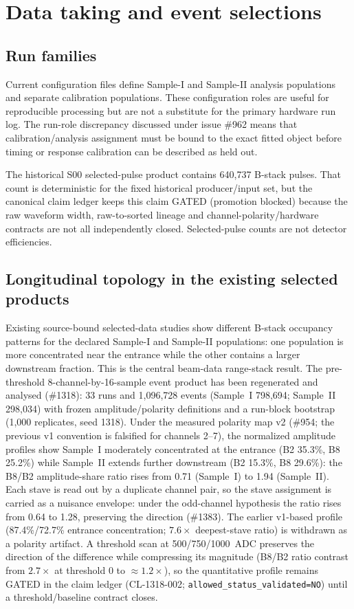 \section{Data taking and event selections}

\subsection{Run families}

Current configuration files define Sample-I and Sample-II analysis populations and separate calibration populations. These configuration roles are useful for reproducible processing but are not a substitute for the primary hardware run log. The run-role discrepancy discussed under issue \#962 means that calibration/analysis assignment must be bound to the exact fitted object before timing or response calibration can be described as held out.

The historical S00 selected-pulse product contains 640,737 B-stack pulses. That count is deterministic for the fixed historical producer/input set, but the canonical claim ledger keeps this claim GATED (promotion blocked) because the raw waveform width, raw-to-sorted lineage and channel-polarity/hardware contracts are not all independently closed. Selected-pulse counts are not detector efficiencies.

\subsection{Longitudinal topology in the existing selected products}

Existing source-bound selected-data studies show different B-stack occupancy patterns for the declared Sample-I and Sample-II populations: one population is more concentrated near the entrance while the other contains a larger downstream fraction. This is the central beam-data range-stack result. The pre-threshold 8-channel-by-16-sample event product has been regenerated and analysed (\#1318): 33 runs and 1{,}096{,}728 events (Sample~I 798{,}694; Sample~II 298{,}034) with frozen amplitude/polarity definitions and a run-block bootstrap (1{,}000 replicates, seed 1318). Under the measured polarity map v2 (\#954; the previous v1 convention is falsified for channels 2--7), the normalized amplitude profiles show Sample~I moderately concentrated at the entrance (B2 35.3\%, B8 25.2\%) while Sample~II extends further downstream (B2 15.3\%, B8 29.6\%): the B8/B2 amplitude-share ratio rises from 0.71 (Sample~I) to 1.94 (Sample~II). Each stave is read out by a duplicate channel pair, so the stave assignment is carried as a nuisance envelope: under the odd-channel hypothesis the ratio rises from 0.64 to 1.28, preserving the direction (\#1383). The earlier v1-based profile (87.4\%/72.7\% entrance concentration; $7.6\times$ deepest-stave ratio) is withdrawn as a polarity artifact. A threshold scan at 500/750/1000~ADC preserves the direction of the difference while compressing its magnitude (B8/B2 ratio contrast from $2.7\times$ at threshold 0 to $\approx 1.2\times$), so the quantitative profile remains GATED in the claim ledger (CL-1318-002; \texttt{allowed\_status\_validated=NO}) until a threshold/baseline contract closes.

